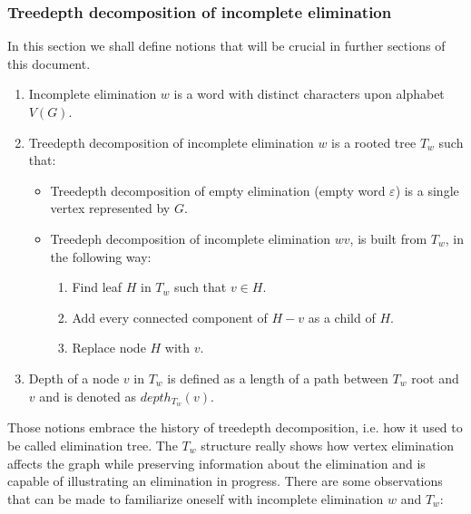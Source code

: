 \subsubsection{Treedepth decomposition of incomplete elimination}
In this section we shall define notions that will be crucial in further sections of this document.
\begin{enumerate}
	\item Incomplete elimination $w$ is a word with distinct characters upon alphabet $V(G)$.
	\item Treedepth decomposition of incomplete elimination $w$ is a rooted tree $T_w$ such that:
	\begin{itemize}
		\item Treedepth decomposition of empty elimination (empty word $\varepsilon$) is a single vertex represented by $G$.
		\item Treedeph decomposition of incomplete elimination $wv$, is built from $T_w$, in the following way:
		\begin{enumerate}
			\item Find leaf $H$ in $T_w$ such that $v\in H$.
			\item Add every connected component of $H-v$ as a child of $H$.
			\item Replace node $H$ with $v$.
		\end{enumerate}
	\end{itemize}
	\item Depth of a node $v$ in $T_w$ is defined as a length of a path between $T_w$ root and $v$ and is denoted as $depth_{T_w}\left(v\right)$.
\end{enumerate}
Those notions embrace the history of treedepth decomposition, i.e. how it used to be called elimination tree. The $T_w$ structure really shows how vertex elimination affects the graph while preserving information about the elimination and is capable of illustrating an elimination in progress.
There are some observations that can be made to familiarize oneself with incomplete elimination $w$ and $T_w$:
